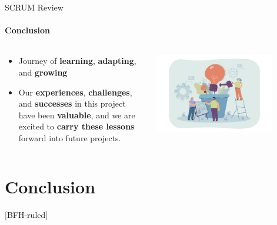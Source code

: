 \documentclass[
ngerman,%
authorontitle=true,
]{bfhbeamer}
\begin{document}
	\begin{frame}{SCRUM Review}
		\framesubtitle{Conclusion}
		\begin{columns} %
			\begin{column}{0.5\textwidth} %
				\begin{itemize}
					\item Journey of \textbf{learning}, \textbf{adapting}, and \textbf{growing}
					\item Our \textbf{experiences}, \textbf{challenges}, and \textbf{successes} in this project have been \textbf{valuable}, and we are excited to \textbf{carry these lessons} forward into future projects.
				\end{itemize}
			\end{column}
			\begin{column}{0.5\textwidth} %
				\centering
				\includegraphics[width=0.8\textwidth]{pictures/final_presentation/Team growing lightbulb plant}
			\end{column}
		\end{columns} %
	\end{frame}

	
	\section{Conclusion}
	[BFH-ruled]
	\frame{\sectionpage}
	
\end{document}
